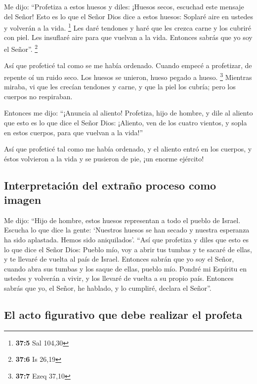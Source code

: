  Me dijo: ``Profetiza a estos huesos y diles: ¡Huesos
secos, escuchad este mensaje del Señor!  Esto es lo que el
Señor Dios dice a estos huesos: Soplaré aire en ustedes y volverán a la
vida. \footnote{\textbf{37:5} Sal 104,30}  Les daré
tendones y haré que les crezca carne y los cubriré con piel. Les
insuflaré aire para que vuelvan a la vida. Entonces sabrás que yo soy el
Señor''. \footnote{\textbf{37:6} Is 26,19}

 Así que profeticé tal como se me había ordenado. Cuando
empecé a profetizar, de repente oí un ruido seco. Los huesos se unieron,
hueso pegado a hueso. \footnote{\textbf{37:7} Ezeq 37,10} 
Mientras miraba, vi que les crecían tendones y carne, y que la piel los
cubría; pero los cuerpos no respiraban.

 Entonces me dijo: ``¡Anuncia al aliento! Profetiza, hijo
de hombre, y dile al aliento que esto es lo que dice el Señor Dios:
¡Aliento, ven de los cuatro vientos, y sopla en estos cuerpos, para que
vuelvan a la vida!''

 Así que profeticé tal como me había ordenado, y el
aliento entró en los cuerpos, y éstos volvieron a la vida y se pusieron
de pie, ¡un enorme ejército!

\hypertarget{interpretaciuxf3n-del-extrauxf1o-proceso-como-imagen}{%
\subsection{Interpretación del extraño proceso como
imagen}\label{interpretaciuxf3n-del-extrauxf1o-proceso-como-imagen}}

 Me dijo: ``Hijo de hombre, estos huesos representan a
todo el pueblo de Israel. Escucha lo que dice la gente: `Nuestros huesos
se han secado y nuestra esperanza ha sido aplastada. Hemos sido
aniquilados'.  ``Así que profetiza y diles que esto es lo
que dice el Señor Dios: Pueblo mío, voy a abrir tus tumbas y te sacaré
de ellas, y te llevaré de vuelta al país de Israel. 
Entonces sabrán que yo soy el Señor, cuando abra sus tumbas y los saque
de ellas, pueblo mío.  Pondré mi Espíritu en ustedes y
volverán a vivir, y los llevaré de vuelta a su propio país. Entonces
sabrás que yo, el Señor, he hablado, y lo cumpliré, declara el Señor''.

\hypertarget{el-acto-figurativo-que-debe-realizar-el-profeta}{%
\subsection{El acto figurativo que debe realizar el
profeta}\label{el-acto-figurativo-que-debe-realizar-el-profeta}}

